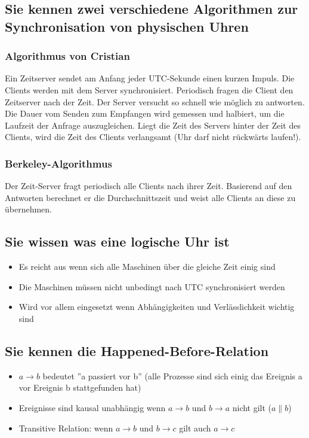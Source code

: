 \subsection{Sie kennen zwei verschiedene Algorithmen zur Synchronisation von physischen Uhren}

\subsubsection{Algorithmus von Cristian}

Ein Zeitserver sendet am Anfang jeder UTC-Sekunde einen kurzen Impuls. Die Clients werden mit dem Server synchronisiert. Periodisch fragen die Client den Zeitserver nach der Zeit. Der Server versucht so schnell wie möglich zu antworten. Die Dauer vom Senden zum Empfangen wird gemessen und halbiert, um die Laufzeit der Anfrage auszugleichen. Liegt die Zeit des Servers hinter der Zeit des Clients, wird die Zeit des Clients verlangsamt (Uhr darf nicht rückwärts laufen!).

\subsubsection{Berkeley-Algorithmus}

Der Zeit-Server fragt periodisch alle Clients nach ihrer Zeit. Basierend auf den Antworten berechnet er die Durchschnittszeit und weist alle Clients an diese zu übernehmen.

\subsection{Sie wissen was eine logische Uhr ist}

\begin{itemize}
	\item Es reicht aus wenn sich alle Maschinen über die gleiche Zeit einig sind
	\item Die Maschinen müssen nicht unbedingt nach UTC synchronisiert werden
	\item Wird vor allem eingesetzt wenn Abhängigkeiten und Verlässlichkeit wichtig sind
\end{itemize}

\subsection{Sie kennen die Happened-Before-Relation}

\begin{itemize}
	\item $a \rightarrow b$ bedeutet ''a passiert vor b'' (alle Prozesse sind sich einig das Ereignis a vor Ereignis b stattgefunden hat)
	\item Ereignisse sind kausal unabhängig wenn $a \rightarrow b$ und $b \rightarrow a$ nicht gilt ($a \parallel b$)
	\item Transitive Relation: wenn $a \rightarrow b$ und $b \rightarrow c$ gilt auch $a \rightarrow c$
\end{itemize}

